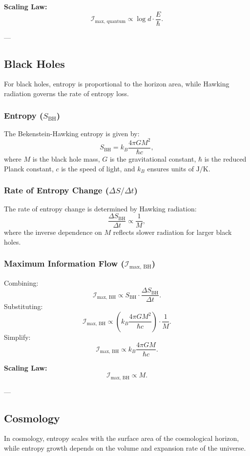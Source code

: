 \documentclass[12pt]{article}
\begin{document}
\textbf{Scaling Law:}
\[
\mathcal{I}_{\text{max, quantum}} \propto \log d \cdot \frac{E}{\hbar}.
\]

---

\subsection{Black Holes}
For black holes, entropy is proportional to the horizon area, while Hawking radiation governs the rate of entropy loss.

\subsubsection{Entropy (\( S_{\text{BH}} \))}
The Bekenstein-Hawking entropy is given by:
\[
S_{\text{BH}} = k_B \frac{4 \pi G M^2}{\hbar c},
\]
where \( M \) is the black hole mass, \( G \) is the gravitational constant, \( \hbar \) is the reduced Planck constant, \( c \) is the speed of light, and \( k_B \) ensures units of \( \text{J/K} \).

\subsubsection{Rate of Entropy Change (\( \Delta S / \Delta t \))}
The rate of entropy change is determined by Hawking radiation:
\[
\frac{\Delta S_{\text{BH}}}{\Delta t} \propto \frac{1}{M},
\]
where the inverse dependence on \( M \) reflects slower radiation for larger black holes.

\subsubsection{Maximum Information Flow (\( \mathcal{I}_{\text{max, BH}} \))}
Combining:
\[
\mathcal{I}_{\text{max, BH}} \propto S_{\text{BH}} \cdot \frac{\Delta S_{\text{BH}}}{\Delta t}.
\]
Substituting:
\[
\mathcal{I}_{\text{max, BH}} \propto \left(k_B \frac{4 \pi G M^2}{\hbar c}\right) \cdot \frac{1}{M}.
\]
Simplify:
\[
\mathcal{I}_{\text{max, BH}} \propto k_B \frac{4 \pi G M}{\hbar c}.
\]

\textbf{Scaling Law:}
\[
\mathcal{I}_{\text{max, BH}} \propto M.
\]

---

\subsection{Cosmology}
In cosmology, entropy scales with the surface area of the cosmological horizon, while entropy growth depends on the volume and expansion rate of the universe.
\end{document}
